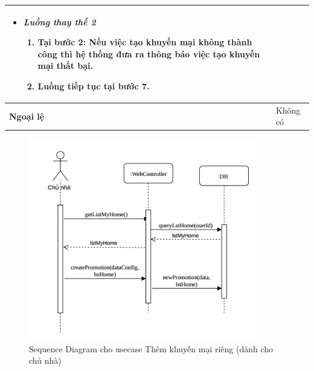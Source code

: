 \begin{center}
\begin{longtable}{ | l |p{10cm}|}
\begin{itemize}
			\item \textit{Luồng thay thế 2}
			\begin{enumerate}
				\item Tại bước 2: Nếu việc tạo khuyến mại không thành công thì hệ thống đưa ra thông báo việc tạo khuyến mại thất bại.
				\item Luồng tiếp tục tại bước 7. 
			\end{enumerate}
		\end{itemize} \\ \hline 
		\textbf{Ngoại lệ}  & Không có \\
		\hline
	\end{longtable}
\end{center}
\newpage 
{}
\begin{figure}[!h]
	\centering
	\includegraphics[width=10cm]{Image/createChuNhaPromo.png}
	\caption{Sequence Diagram cho usecase Thêm khuyến mại riêng (dành cho chủ nhà)}
\end{figure}

